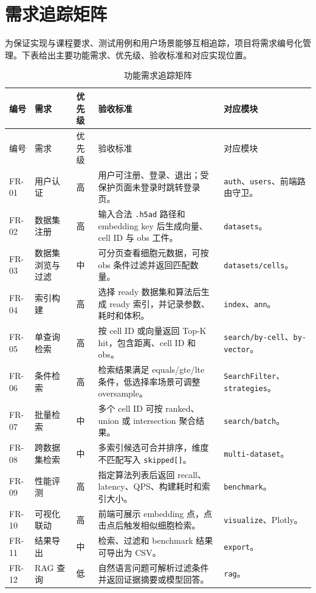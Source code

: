 \documentclass[UTF8,a4paper,12pt]{ctexrep}
\begin{document}
\section{需求追踪矩阵}

为保证实现与课程要求、测试用例和用户场景能够互相追踪，项目将需求编号化管理。下表给出主要功能需求、优先级、验收标准和对应实现位置。

\begin{longtable}{@{}L{0.09\textwidth}L{0.17\textwidth}L{0.08\textwidth}L{0.32\textwidth}L{0.22\textwidth}@{}}
  \caption{功能需求追踪矩阵} \\
  \toprule
  编号 & 需求 & 优先级 & 验收标准 & 对应模块 \\
  \midrule
  \endfirsthead
  \toprule
  编号 & 需求 & 优先级 & 验收标准 & 对应模块 \\
  \midrule
  \endhead
  FR-01 & 用户认证 & 高 & 用户可注册、登录、退出；受保护页面未登录时跳转登录页。 & \texttt{auth}、\texttt{users}、前端路由守卫。 \\
  FR-02 & 数据集注册 & 高 & 输入合法 \texttt{.h5ad} 路径和 embedding key 后生成向量、cell ID 与 obs 工件。 & \texttt{datasets}。 \\
  FR-03 & 数据集浏览与过滤 & 中 & 可分页查看细胞元数据，可按 obs 条件过滤并返回匹配数量。 & \texttt{datasets/cells}。 \\
  FR-04 & 索引构建 & 高 & 选择 ready 数据集和算法后生成 ready 索引，并记录参数、耗时和体积。 & \texttt{index}、\texttt{ann}。 \\
  FR-05 & 单查询检索 & 高 & 按 cell ID 或向量返回 Top-K hit，包含距离、cell ID 和 obs。 & \texttt{search/by-cell}、\texttt{by-vector}。 \\
  FR-06 & 条件检索 & 高 & 检索结果满足 equals/gte/lte 条件，低选择率场景可调整 oversample。 & \texttt{SearchFilter}、\texttt{strategies}。 \\
  FR-07 & 批量检索 & 中 & 多个 cell ID 可按 ranked、union 或 intersection 聚合结果。 & \texttt{search/batch}。 \\
  FR-08 & 跨数据集检索 & 中 & 多索引候选可合并排序，维度不匹配写入 \texttt{skipped[]}。 & \texttt{multi-dataset}。 \\
  FR-09 & 性能评测 & 高 & 指定算法列表后返回 recall、latency、QPS、构建耗时和索引大小。 & \texttt{benchmark}。 \\
  FR-10 & 可视化联动 & 高 & 前端可展示 embedding 点，点击点后触发相似细胞检索。 & \texttt{visualize}、Plotly。 \\
  FR-11 & 结果导出 & 中 & 检索、过滤和 benchmark 结果可导出为 CSV。 & \texttt{export}。 \\
  FR-12 & RAG 查询 & 低 & 自然语言问题可解析过滤条件并返回证据摘要或模型回答。 & \texttt{rag}。 \\
  \bottomrule
\end{longtable}
\end{document}
